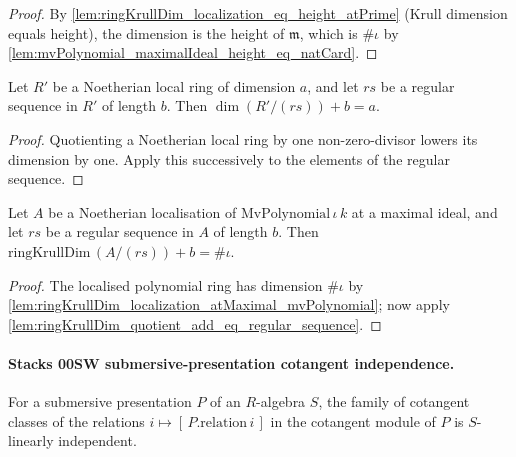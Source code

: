 \begin{proof}
  By
  \cref{lem:ringKrullDim_localization_eq_height_atPrime} (Krull dimension equals
  height), the dimension is the height of \(\mathfrak m\), which is
  \(\#\iota\) by \cref{lem:mvPolynomial_maximalIdeal_height_eq_natCard}.
\end{proof}

\begin{lemma}
  \label{lem:ringKrullDim_quotient_add_eq_regular_sequence}
  Let \(R'\) be a Noetherian local ring of dimension \(a\), and let
  \(rs\) be a regular sequence in \(R'\) of length \(b\). Then
  \(\dim(R'/(rs)) + b = a\).
\end{lemma}

\begin{proof}
  Quotienting a Noetherian local ring by one non-zero-divisor lowers its
  dimension by one.  Apply this successively to the elements of the
  regular sequence.
\end{proof}

\begin{lemma}
  \label{lem:ringKrullDim_quotient_localization_mvPolynomial_regular}
  Let \(A\) be a Noetherian localisation of \(\mathrm{MvPolynomial}\,\iota\,k\) at a
  maximal ideal, and let \(rs\) be a regular sequence in \(A\) of length \(b\). Then
  \(\mathrm{ringKrullDim}\,(A/(rs)) + b = \#\iota\).
\end{lemma}

\begin{proof}
  The localised polynomial ring has dimension \(\#\iota\) by
  \cref{lem:ringKrullDim_localization_atMaximal_mvPolynomial}; now apply
  \cref{lem:ringKrullDim_quotient_add_eq_regular_sequence}.
\end{proof}

\paragraph{Stacks 00SW submersive-presentation cotangent independence.}

\begin{lemma}
  \label{lem:submersive_relation_cotangent_linearIndependent}
  For a submersive presentation \(P\) of an \(R\)-algebra \(S\), the family of
  cotangent classes of the relations \(i \mapsto [\,P.\mathrm{relation}\,i\,]\) in the
  cotangent module of \(P\) is \(S\)-linearly independent.
\end{lemma}

